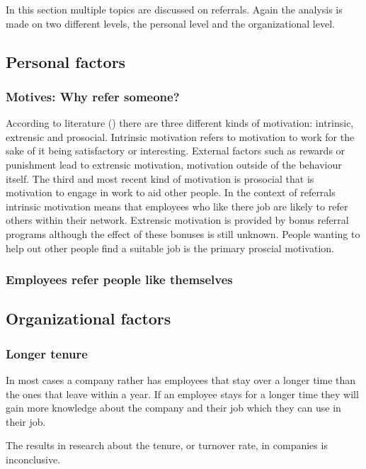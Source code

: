 \documentclass[Main.tex]{subfiles}
\begin{document}
In this section multiple topics are discussed on referrals. Again the analysis is made on two different levels, the personal level and the organizational level. 

\subsection*{Personal factors}

\subsubsection*{Motives: Why refer someone?}

According to literature (\cite{motives}) there are three different kinds of motivation: intrinsic, extrensic and prosocial. Intrinsic motivation refers to motivation to work for the sake of it being satisfactory or interesting. External factors such as rewards or punishment lead to extrensic motivation, motivation outside of the behaviour itself. The third and most recent kind of motivation is prosocial that is motivation to engage in work to aid other people. In the context of referrals intrinsic motivation means that employees who like there job are likely to refer others within their network. Extrensic motivation is provided by bonus referral programs although the effect of these bonuses is still unknown. People wanting to help out other people find a suitable job is the primary proscial motivation.

\subsubsection*{Employees refer people like themselves}


\subsection*{Organizational factors}

\subsubsection*{Longer tenure} %
In most cases a company rather has employees that stay over a longer time than the ones that leave within a year. If an employee stays for a longer time they will gain more knowledge about the company and their job which they can use in their job. 

The results in research about the tenure, or turnover rate, in companies is inconclusive.
\end{document}
